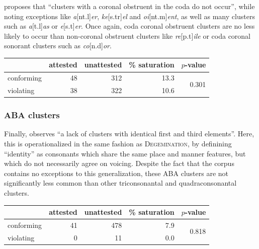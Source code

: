 \citet[175]{Pierrehumbert1994} proposes that ``clusters with a coronal obstruent in the coda do not occur'', while noting exceptions like \emph{a}[nt.l]\emph{er}, \emph{ke}[s.tr]\emph{el} and \emph{oi}[nt.m]\emph{ent}, as well as many clusters such as \emph{a}[t.l]\emph{as} or \emph{e}[s.t]\emph{er}. Once again, coda coronal obstruent clusters are no less likely to occur than non-coronal obstruent clusters like \emph{re}[p.t]\emph{ile} or coda coronal sonorant clusters such as \emph{co}[n.d]\emph{or}.

\begin{example}
\begin{tabular}{l r r r r}
\toprule
           & attested & unattested & \% saturation & $p$-value              \\
\midrule
conforming & 48       & 312        & 13.3      & \multirow{2}{*}{0.301} \\
violating  & 38       & 322        & 10.6                               \\
\bottomrule
\end{tabular}
\end{example}

\subsubsection{ABA clusters}

Finally, \citet[][176]{Pierrehumbert1994} observes ``a lack of clusters with identical first and third elements''. Here, this is operationalized in the same fashion as \textsc{Degemination}, by definining ``identity'' as consonants which share the same place and manner features, but which do not necessarily agree on voicing. Despite the fact that the corpus contains no exceptions to this generalization, these \textsc{ABA} clusters are not significantly less common than other triconsonantal and quadraconsonantal clusters.

\begin{example}
\begin{tabular}{l r r r r}
\toprule
           & attested & unattested & \% saturation & $p$-value \\
\midrule
conforming & 41       & 478        & 7.9      & \multirow{2}{*}{0.818} \\
violating  &  0       &  11        & 0.0                               \\
\bottomrule
\end{tabular}
\end{example}

